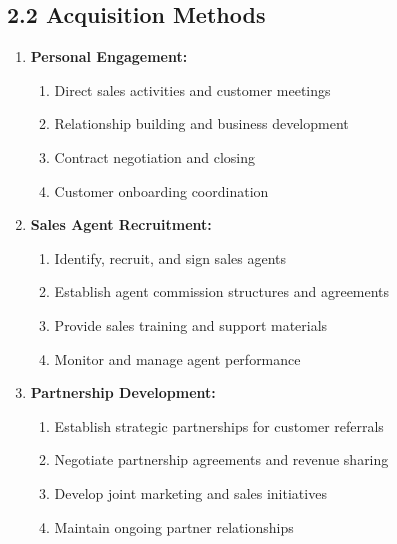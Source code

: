 \subsection*{2.2 Acquisition Methods}
\begin{enumerate}[label=\arabic*.]
\item \textbf{Personal Engagement:}
    \begin{enumerate}[label=(\alph*)]
    \item Direct sales activities and customer meetings
    \item Relationship building and business development
    \item Contract negotiation and closing
    \item Customer onboarding coordination
    \end{enumerate}

\item \textbf{Sales Agent Recruitment:}
    \begin{enumerate}[label=(\alph*)]
    \item Identify, recruit, and sign sales agents
    \item Establish agent commission structures and agreements
    \item Provide sales training and support materials
    \item Monitor and manage agent performance
    \end{enumerate}

\item \textbf{Partnership Development:}
    \begin{enumerate}[label=(\alph*)]
    \item Establish strategic partnerships for customer referrals
    \item Negotiate partnership agreements and revenue sharing
    \item Develop joint marketing and sales initiatives
    \item Maintain ongoing partner relationships
    \end{enumerate}
\end{enumerate}

